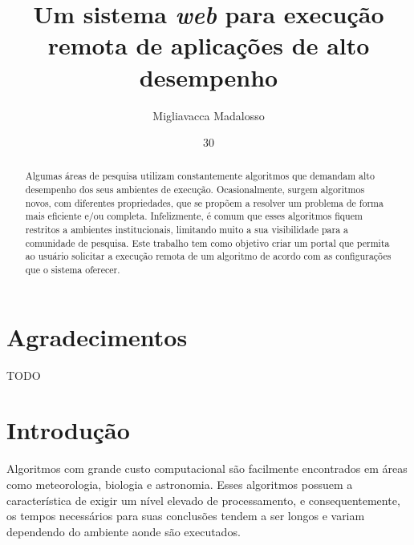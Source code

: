 \documentclass[tg]{mdtufsm}
\title{Um sistema \emph{ web } para execução remota de aplicações de alto desempenho}
\author{Migliavacca Madalosso}{Otávio}
\institute{Centro de Tecnologia}
\date{30}{Novembro}{2015}
\begin{document}
\maketitle
\makeapprove

\chapter*{Agradecimentos}
TODO

\begin{abstract}
Algumas áreas de pesquisa utilizam constantemente algoritmos que demandam alto desempenho dos seus ambientes de execução. Ocasionalmente, surgem algoritmos novos, com diferentes propriedades, que se propõem a resolver um problema de forma mais eficiente e/ou completa. Infelizmente, é comum que esses algoritmos fiquem restritos a ambientes institucionais, limitando muito a sua visibilidade para a comunidade de pesquisa. Este trabalho tem como objetivo criar um portal que permita ao usuário solicitar a execução remota de um algoritmo de acordo com as configurações que o sistema oferecer.
\end{abstract}



\tableofcontents
\listoffigures

\setlength{\baselineskip}{1.5\baselineskip}


\chapter{Introdução}

Algoritmos com grande custo computacional são facilmente encontrados em áreas como meteorologia, biologia e astronomia. Esses algoritmos possuem a característica de exigir um nível elevado de processamento, e consequentemente, os tempos necessários para suas conclusões tendem a ser longos e variam dependendo do ambiente aonde são executados.
\end{document}
